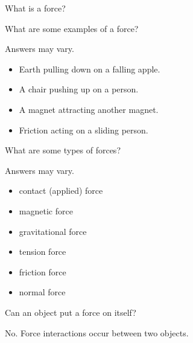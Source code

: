 \documentclass[answers]{exam}
\begin{document}
\begin{questions}

\question
What is a force?


\question
What are some examples of a force?

\begin{solution}
    Answers may vary.

    \begin{itemize}[itemsep=0pt]
        \item Earth pulling down on a falling apple. 
        \item A chair pushing up on a person.
        \item A magnet attracting another magnet.
        \item Friction acting on a sliding person.
    \end{itemize}
\end{solution}

\question
What are some types of forces?

\begin{solution}
    Answers may vary.

    \begin{itemize}[itemsep=0pt]
        \item contact (applied) force
        \item magnetic force
        \item gravitational force
        \item tension force
        \item friction force
        \item normal force
    \end{itemize}
\end{solution}

\question
Can an object put a force on itself? %

\begin{solution}
    No. Force interactions occur between two objects.
\end{solution}

\question
{}
\end{questions}
\end{document}
